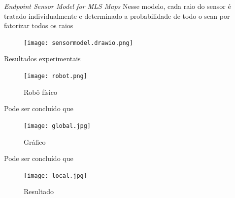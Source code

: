 \begin{frame}[c]{\textit{Endpoint Sensor Model for MLS Maps}}
    Nesse modelo, cada raio do sensor é tratado individualmente e determinado a probabilidade de todo o scan por fatorizar todos os raios
    \newline

    \begin{center}
        \begin{figure}
            \texttt{[image: sensormodel.drawio.png]}
        \end{figure}
    \end{center}


\end{frame}

\begin{frame}[c]{Resultados experimentais}
    \begin{figure}
        \texttt{[image: robot.png]}
       
          
        \caption{Robô físico\cite{article}}
    \end{figure}
\end{frame}

\begin{frame}[c]{Pode ser concluído que}
    \begin{center}
        \begin{figure}
                \texttt{[image: global.jpg]}
                \caption{Gráfico\cite{article}}
            \end{figure}
    \end{center}
\end{frame}

\begin{frame}[c]{Pode ser concluído que}
    \begin{center}
        \begin{figure}
                \texttt{[image: local.jpg]}
                \caption{Resultado\cite{article}}
            \end{figure}
    \end{center}
\end{frame}